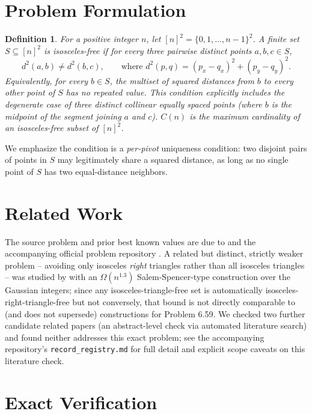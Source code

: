 \documentclass[11pt]{article}
\newtheorem{definition}{Definition}
\begin{document}
\section{Problem Formulation}

\begin{definition}
For a positive integer $n$, let $[n]^2 = \{0,1,\dots,n-1\}^2$. A finite set
$S \subseteq [n]^2$ is \emph{isosceles-free} if for every three pairwise distinct
points $a,b,c \in S$,
\[
  d^2(a,b) \neq d^2(b,c), \qquad \text{where } d^2(p,q) = (p_x-q_x)^2 + (p_y-q_y)^2.
\]
Equivalently, for every $b \in S$, the multiset of squared distances from $b$ to
every other point of $S$ has no repeated value. This condition explicitly includes
the degenerate case of three distinct collinear equally spaced points (where $b$ is
the midpoint of the segment joining $a$ and $c$). $C(n)$ is the maximum cardinality
of an isosceles-free subset of $[n]^2$.
\end{definition}

We emphasize the condition is a \emph{per-pivot} uniqueness condition: two disjoint
pairs of points in $S$ may legitimately share a squared distance, as long as no
single point of $S$ has two equal-distance neighbors.

\section{Related Work}

The source problem and prior best known values are due to \cite{georgiev2025mathematical}
and the accompanying official problem repository \cite{alphaevolverepo}. A related
but distinct, strictly weaker problem -- avoiding only isosceles \emph{right}
triangles rather than all isosceles triangles -- was studied by
\cite{karolyi2026salem} with an $\Omega(n^{1.3})$ Salem-Spencer-type construction
over the Gaussian integers; since any isosceles-triangle-free set is automatically
isosceles-right-triangle-free but not conversely, that bound is not directly
comparable to (and does not supersede) constructions for Problem 6.59. We checked
two further candidate related papers (an abstract-level check via automated
literature search) and found neither addresses this exact problem; see the
accompanying repository's \texttt{record\_registry.md} for full detail and explicit
scope caveats on this literature check.

\section{Exact Verification}
\end{document}
